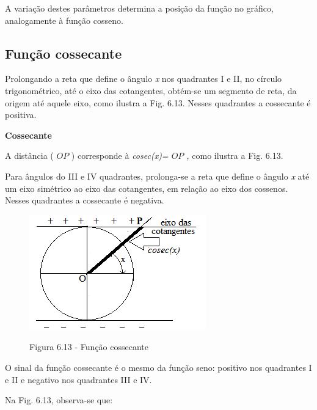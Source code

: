 A variação destes parâmetros determina a posição da função no gráfico, analogamente à função cosseno.

\subsection{Função cossecante}

Prolongando a reta que define o ângulo \textit{x }nos quadrantes I e II, no círculo trigonométrico, até o eixo das cotangentes, obtém-se um segmento de reta, da origem até aquele eixo, como ilustra a Fig. 6.13. Nesses quadrantes a cossecante é positiva.

\begin{caixa}
\textbf{Cossecante}

\begin{multicols}{2}
A distância ( \( OP \) ) corresponde à \textit{cosec(x)= \(  OP \) , }como ilustra a Fig. 6.13.

Para ângulos do III e IV quadrantes, prolonga-se a reta que define o ângulo \textit{x }até um eixo simétrico ao eixo das cotangentes, em relação ao eixo dos cossenos. Nesses quadrantes a cossecante é negativa.

\begin{figure}[H]
    \begin{Center}
        \includegraphics[width=3.01in,height=1.96in]{capitulos/trigonometria_e_funcoes_trigonometricas/media/image42.png}

        Figura 6.13  - Função cossecante
    \end{Center}
\end{figure}

\end{multicols}
\end{caixa}

O sinal da função cossecante é o mesmo da função seno: positivo nos quadrantes I e II e negativo nos quadrantes III e IV.

Na Fig. 6.13, observa-se que:

